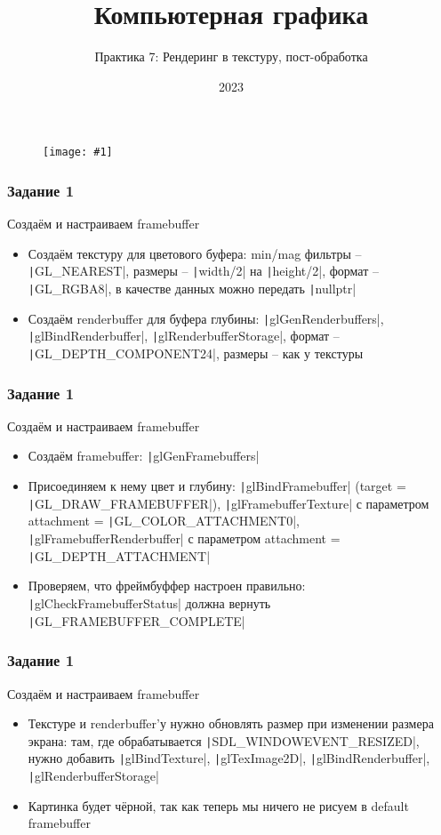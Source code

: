 \documentclass[10pt]{beamer}
\title{Компьютерная графика}
\subtitle{Практика 7: Рендеринг в текстуру, пост-обработка}
\date{2023}
\newcommand{\slideimage}[1]{
  \begin{figure}
    \begin{adjustbox}{width=\textwidth, totalheight=\textheight-2\baselineskip-2\baselineskip,keepaspectratio}
      \texttt{[image: \#1]}
    \end{adjustbox}
  \end{figure}
}
\begin{document}
\frame{\titlepage}

\begin{frame}[fragile]
\slideimage{0.png}
\end{frame}


\begin{frame}[fragile]
\frametitle{Задание 1}
Создаём и настраиваем framebuffer
\begin{itemize}
\item Создаём текстуру для цветового буфера: min/mag фильтры -- \texttt|GL_NEAREST|, размеры -- \texttt|width/2| на \texttt|height/2|, формат -- \texttt|GL_RGBA8|, в качестве данных можно передать \texttt|nullptr|
\item Создаём renderbuffer для буфера глубины: \texttt|glGenRenderbuffers|, \texttt|glBindRenderbuffer|, \texttt|glRenderbufferStorage|, формат -- \texttt|GL_DEPTH_COMPONENT24|, размеры -- как у текстуры
\end{itemize}
\end{frame}

\begin{frame}[fragile]
\frametitle{Задание 1}
Создаём и настраиваем framebuffer
\begin{itemize}
\item Создаём framebuffer: \texttt|glGenFramebuffers|
\item Присоединяем к нему цвет и глубину: \texttt|glBindFramebuffer| (target = \texttt|GL_DRAW_FRAMEBUFFER|), \texttt|glFramebufferTexture| с параметром attachment = \texttt|GL_COLOR_ATTACHMENT0|, \texttt|glFramebufferRenderbuffer| с параметром attachment = \texttt|GL_DEPTH_ATTACHMENT|
\item Проверяем, что фреймбуффер настроен правильно: \texttt|glCheckFramebufferStatus| должна вернуть \texttt|GL_FRAMEBUFFER_COMPLETE|
\end{itemize}
\end{frame}

\begin{frame}[fragile]
\frametitle{Задание 1}
Создаём и настраиваем framebuffer
\begin{itemize}
\item Текстуре и renderbuffer'у нужно обновлять размер при изменении размера экрана: там, где обрабатывается \texttt|SDL_WINDOWEVENT_RESIZED|, нужно добавить \texttt|glBindTexture|, \texttt|glTexImage2D|, \texttt|glBindRenderbuffer|, \texttt|glRenderbufferStorage|
\item Картинка будет чёрной, так как теперь мы ничего не рисуем в default framebuffer
\end{itemize}
\end{frame}
\end{document}
